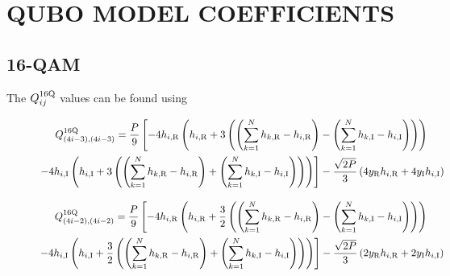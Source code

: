 \chapter{QUBO MODEL COEFFICIENTS}  \label{Chapter:append}
\section{16-QAM}
The $Q_{ij}^{16{\rm Q}}$ values can be found using
\vspace{-1cm}
\begin{figure}[H]

	\begin{multline}
		\label{16q_Q_4i_minus_3_both}
		Q_{(4i-3),(4i-3)}^{16{\rm Q}} = \frac{P}{9} \left[ 
		-4 h_{i,{\rm R}} \left( h_{i,{\rm R}} + 3 \left(  \left( \sum_{k=1}^{N} h_{k,{\rm R}} - h_{i,{\rm R}} \right) - \left( \sum_{k=1}^{N} h_{k,{\rm I}} - h_{i,{\rm I}} \right)
		\right) \right)
		\right. \\
		\left.
		-4 h_{i,{\rm I}} \left( h_{i,{\rm I}} + 3 \left(  \left( \sum_{k=1}^{N} h_{k,{\rm R}} - h_{i,{\rm R}} \right) + \left( \sum_{k=1}^{N} h_{k,{\rm I}} - h_{i,{\rm I}} \right)
		\right) \right) 
		\right] 
		- \frac{\sqrt{2 P}}{3}\left( 4 y_{\rm R} h_{i,{\rm R}} + 4 y_{\rm I} h_{i,{\rm I}} \right)
	\end{multline}
 \end{figure}
 \vspace{-1.9cm}
 \begin{figure}[H]
	\begin{multline}
		\label{16q_Q_4i_minus_2_both}
		Q_{(4i-2),(4i-2)}^{16{\rm Q}} = \frac{P}{9} \left[ 
		-4 h_{i,{\rm R}} \left( h_{i,{\rm R}} + \frac{3}{2} \left(  \left( \sum_{k=1}^{N} h_{k,{\rm R}} - h_{i,{\rm R}} \right) - \left( \sum_{k=1}^{N} h_{k,{\rm I}} - h_{i,{\rm I}} \right)
		\right) \right)
		\right. \\
		\left.
		-4 h_{i,{\rm I}} \left( h_{i,{\rm I}} + \frac{3}{2} \left(  \left( \sum_{k=1}^{N} h_{k,{\rm R}} - h_{i,{\rm R}} \right) + \left( \sum_{k=1}^{N} h_{k,{\rm I}} - h_{i,{\rm I}} \right)
		\right) \right) 
		\right] 
		- \frac{\sqrt{2 P}}{3}\left( 2 y_{\rm R} h_{i,{\rm R}} + 2 y_{\rm I} h_{i,{\rm I}} \right)
	\end{multline}
 \end{figure}
 \vspace{-1.9cm}
